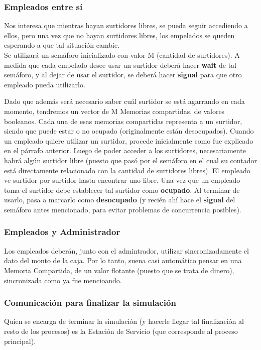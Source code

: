 \documentclass[a4paper,12pt]{article}
\begin{document}
\subsubsection{Empleados entre sí}
Nos interesa que mientras hayan surtidores libres, se pueda seguir accediendo a ellos, pero una vez que no hayan surtidores libres, los empelados se queden esperando a que tal situación cambie.\\
Se utilizará un semáforo inicializado con valor M (cantidad de surtidores). A medida que cada empelado desee usar un surtidor deberá hacer \textbf{wait} de tal semáforo, y al dejar de usar el surtidor, se deberá hacer \textbf{signal} para que otro empleado pueda utilizarlo.

Dado que además será necesario saber cuál surtidor se está agarrando en cada momento, tendremos un vector de M Memorias compartidas, de valores booleanos. Cada una de esas memorias compartidas representa a un surtidor, siendo que puede estar o no ocupado (originalmente están desocupados). Cuando un empleado quiere utilizar un surtidor, procede inicialmente como fue explicado en el párrafo anterior. Luego de poder acceder a los surtidores, necesariamente habrá algún surtidor libre (puesto que pasó por el semáforo en el cual su contador está directamente relacionado con la cantidad de surtidores libres). El empleado ve surtidor por surtidor hasta encontrar uno libre. Una vez que un empleado toma el surtidor debe establecer tal surtidor como \textbf{ocupado}. Al terminar de usarlo, pasa a marcarlo como \textbf{desocupado} (y recién ahí hace el \textbf{signal} del semáforo antes mencionado, para evitar problemas de concurrencia posibles).

\subsubsection{Empleados y Administrador}
Los empleados deberán, junto con el admintrador, utilizar sincronizadamente el dato del monto de la caja. Por lo tanto, suena casi automático pensar en una Memoria Compartida, de un valor flotante (puesto que se trata de dinero), sincronizada como ya fue mencioando.

\subsubsection{Comunicación para finalizar la simulación}
Quien se encarga de terminar la simulación (y hacerle llegar tal finalización al resto de los procesos) es la Estación de Servicio (que corresponde al proceso principal).
\end{document}
